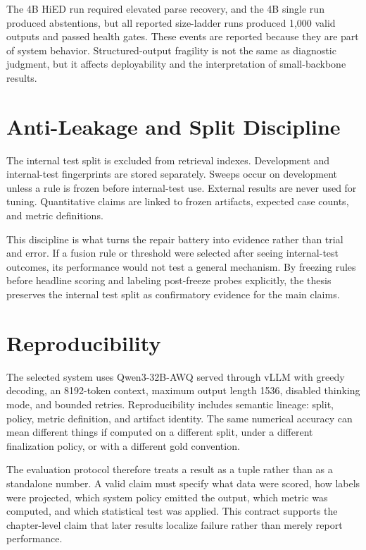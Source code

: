 The 4B HiED run required elevated parse recovery, and the 4B single run produced abstentions, but all reported size-ladder runs produced 1,000 valid outputs and passed health gates. These events are reported because they are part of system behavior. Structured-output fragility is not the same as diagnostic judgment, but it affects deployability and the interpretation of small-backbone results.

\section{Anti-Leakage and Split Discipline}

The internal test split is excluded from retrieval indexes. Development and internal-test fingerprints are stored separately. Sweeps occur on development unless a rule is frozen before internal-test use. External results are never used for tuning. Quantitative claims are linked to frozen artifacts, expected case counts, and metric definitions.

This discipline is what turns the repair battery into evidence rather than trial and error. If a fusion rule or threshold were selected after seeing internal-test outcomes, its performance would not test a general mechanism. By freezing rules before headline scoring and labeling post-freeze probes explicitly, the thesis preserves the internal test split as confirmatory evidence for the main claims.

\section{Reproducibility}

The selected system uses Qwen3-32B-AWQ served through vLLM with greedy decoding, an 8192-token context, maximum output length 1536, disabled thinking mode, and bounded retries. Reproducibility includes semantic lineage: split, policy, metric definition, and artifact identity. The same numerical accuracy can mean different things if computed on a different split, under a different finalization policy, or with a different gold convention.

The evaluation protocol therefore treats a result as a tuple rather than as a standalone number. A valid claim must specify what data were scored, how labels were projected, which system policy emitted the output, which metric was computed, and which statistical test was applied. This contract supports the chapter-level claim that later results localize failure rather than merely report performance.
